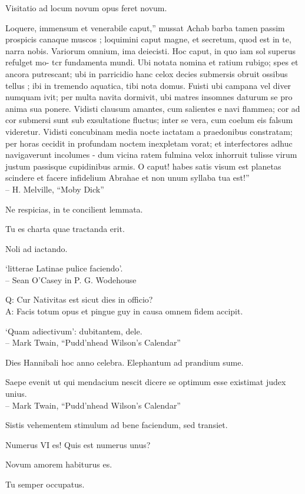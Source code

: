 \documentclass[titlepage,12pt]{memoir}
\begin{document}
Visitatio ad locum novum opus feret novum.

Loquere, immensum et venerabile caput,” mussat Achab
barba tamen passim prospicis canaque muscos ; loquimini
caput magne, et secretum, quod est in te, narra nobis. Variorum omnium,
ima deiecisti. Hoc caput, in quo iam sol superus refulget
mo- tcr fundamenta mundi. Ubi notata nomina et ratium rubigo;
spes et ancora putrescant; ubi in parricidio hanc celox
decies submersis obruit ossibus tellus ; ibi in tremendo
aquatica, tibi nota domus. Fuisti ubi campana vel
diver numquam ivit; per multa navita dormivit, ubi matres insomnes
daturum se pro anima sua ponere. Vidisti clausum amantes, cum
salientes e navi flammea; cor ad cor submersi sunt sub exsultatione
fluctus; inter se vera, cum coelum eis falsum videretur. Vidisti
concubinam media nocte iactatam a praedonibus constratam; per horas cecidit
in profundam noctem inexpletam vorat; et interfectores adhuc navigaverunt
incolumes - dum vicina ratem fulmina velox inhorruit
tulisse virum justum passisque cupidinibus armis. O caput! habes
satis visum est planetas scindere et facere infidelium Abrahae et non unum
syllaba tua est!”
\\-- H. Melville, “Moby Dick”

Ne respicias, in te concilient lemmata.

Tu es charta quae tractanda erit.

Noli ad iactando.

‘litterae Latinae pulice faciendo’.
\\-- Sean O’Casey in P. G. Wodehouse

Q: Cur Nativitas est sicut dies in officio?\\
A: Facis totum opus et pingue guy in causa
omnem fidem accipit.

‘Quam adiectivum’: dubitantem, dele.
\\-- Mark Twain, “Pudd’nhead Wilson’s Calendar”

Dies Hannibali hoc anno celebra. Elephantum ad prandium sume.

Saepe evenit ut qui mendacium nescit dicere se optimum esse existimat
judex unius.
\\-- Mark Twain, “Pudd’nhead Wilson’s Calendar”

Sistis vehementem stimulum ad bene faciendum, sed transiet.

Numerus VI es! Quis est numerus unus?

Novum amorem habiturus es.

Tu semper occupatus.
\end{document}
